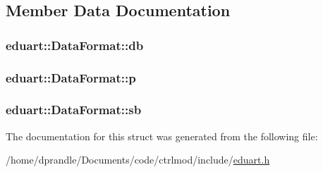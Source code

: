 \subsection{Member Data Documentation}
\hypertarget{structeduart_1_1DataFormat_a9bcbfb5d9a0e9720440b7487e300725a}{
\subsubsection[{db}]{ eduart\-::\-Data\-Format\-::db}}\label{structeduart_1_1DataFormat_a9bcbfb5d9a0e9720440b7487e300725a}
\hypertarget{structeduart_1_1DataFormat_acb10f62257fad3e05c072b0926d04697}{
\subsubsection[{p}]{ eduart\-::\-Data\-Format\-::p}}\label{structeduart_1_1DataFormat_acb10f62257fad3e05c072b0926d04697}
\hypertarget{structeduart_1_1DataFormat_a00afa036bb12c742f13548afa4fb593e}{
\subsubsection[{sb}]{ eduart\-::\-Data\-Format\-::sb}}\label{structeduart_1_1DataFormat_a00afa036bb12c742f13548afa4fb593e}


The documentation for this struct was generated from the following file\-:\begin{DoxyCompactItemize}
\item 
/home/dprandle/\-Documents/code/ctrlmod/include/\hyperlink{eduart_8h}{eduart.\-h}\end{DoxyCompactItemize}
